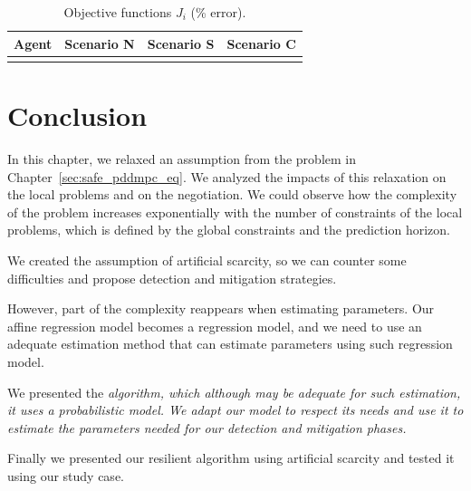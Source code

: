 \documentclass[../main.tex]{subfiles}
\begin{document}
\begin{table}[h]
  \centering
  \caption{Objective functions $J_{i}$ (\% error).}\label{tab:costsGlobalLocal}
  \begin{tabular}[t]{cccc}
    \toprule
    Agent  & Scenario N& Scenario S & Scenario C\\
    \midrule
    \\
    \bottomrule
  \end{tabular}
\end{table}

\section{Conclusion}\label{sec:conclusion_ineq}
In this chapter, we relaxed an assumption from the problem in Chapter~\ref{sec:safe_pddmpc_eq}. We analyzed the impacts of this relaxation on the local problems and on the negotiation.
We could observe how the complexity of the problem increases exponentially with the number of constraints of the local problems, which is defined by the global constraints and the prediction horizon.

We created the assumption of artificial scarcity, so we can counter some difficulties and propose detection and mitigation strategies.

However, part of the complexity reappears when estimating parameters.
Our affine regression model becomes a \pwa{} regression model, and we need to use an adequate estimation method that can estimate parameters using such regression model.

We presented the \em{} algorithm,  which although may be adequate for such estimation, it uses a probabilistic model. We adapt our model to respect its needs and use it to estimate the parameters needed for our detection and mitigation phases.

Finally we presented our resilient algorithm using artificial scarcity and tested it using our \dhn{} study case.

\end{document}

